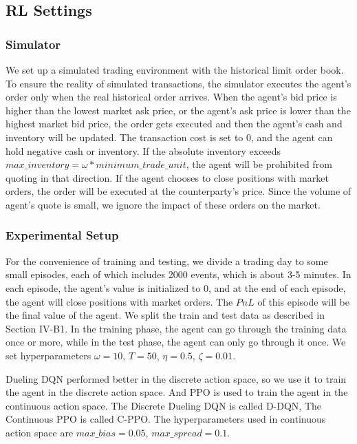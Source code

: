 \documentclass[conference]{IEEEtran}
\begin{document}
\subsection{RL Settings}

\subsubsection{Simulator}
We set up a simulated trading environment with the historical limit order book. To ensure the reality of simulated transactions, the simulator executes the agent's order only when the real historical order arrives. When the agent's bid price is higher than the lowest market ask price, or the agent's ask price is lower than the highest market bid price, the order gets executed and then the agent's cash and inventory will be updated. The transaction cost is set to 0, and the agent can hold negative cash or inventory. If the absolute inventory exceeds $max\_inventory = \omega * minimum\_trade\_unit$, the agent will be prohibited from quoting in that direction. If the agent chooses to close positions with market orders, the order will be executed at the counterparty's price. Since the volume of agent's quote is small, we ignore the impact of these orders on the market.

\subsubsection{Experimental Setup}
For the convenience of training and testing, we divide a trading day to some small episodes, each of which includes 2000 events, which is about 3-5 minutes. In each episode, the agent's value is initialized to 0, and at the end of each episode, the agent will close positions with market orders. The $PnL$ of this episode will be the final value of the agent. We split the train and test data as described in Section IV-B1. In the training phase, the agent can go through the training data once or more, while in the test phase, the agent can only go through it once. We set hyperparameters $\omega = 10$, $T = 50$, $\eta = 0.5$, $\zeta = 0.01$.

Dueling DQN performed better in the discrete action space, so we use it to train the agent in the discrete action space. And PPO is used to train the agent in the continuous action space. The Discrete Dueling DQN is called D-DQN, The Continuous PPO is called C-PPO. The hyperparameters used in continuous action space are $max\_bias = 0.05$, $max\_spread = 0.1$.
\end{document}
